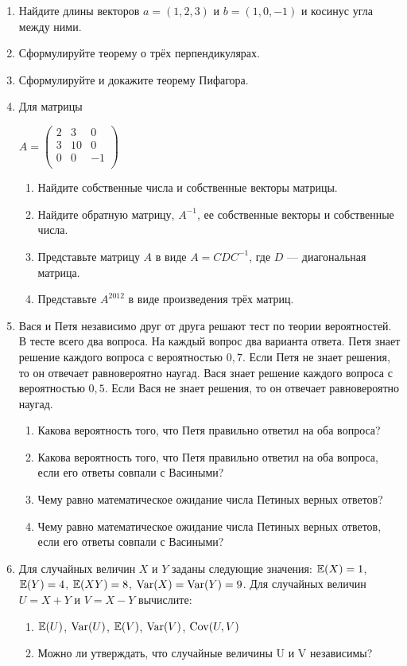 \documentclass[12pt, a4paper]{article}\usepackage[]{graphicx}\usepackage[]{color}
\begin{document}
\begin{enumerate}
\item Найдите длины векторов $a=(1,2,3)$ и $b=(1,0,-1)$ и косинус угла между ними.
\item Сформулируйте теорему о трёх перпендикулярах.
\item Сформулируйте и докажите теорему Пифагора.
\item Для матрицы

$A=\left(%
\begin{array}{ccc}
  2 & 3 & 0 \\
  3 & 10 & 0 \\
  0 & 0 & -1 \\
\end{array}%
\right)$ \\

\begin{enumerate}
\item Найдите собственные числа и собственные векторы матрицы.
\item Найдите обратную матрицу, $A^{-1}$, ее собственные векторы и собственные числа.
\item Представьте матрицу $A$ в виде $A=CDC^{-1}$, где $D$ — диагональная матрица.
\item Представьте $A^{2012}$ в виде произведения трёх матриц.
\end{enumerate}

\item Вася и Петя независимо друг от друга решают тест по теории вероятностей. В тесте всего два вопроса. На каждый вопрос два варианта ответа. Петя знает решение каждого вопроса с вероятностью $0{,}7$. Если Петя не знает решения, то он отвечает равновероятно наугад. Вася знает решение каждого вопроса с вероятностью $0{,}5$. Если Вася не знает решения, то он отвечает равновероятно наугад.
\begin{enumerate}
\item Какова вероятность того, что Петя правильно ответил на оба вопроса?
\item Какова вероятность того, что Петя правильно ответил на оба вопроса, если его ответы совпали с Васиными?
\item Чему равно математическое ожидание числа Петиных верных ответов?
\item Чему равно математическое ожидание числа Петиных верных ответов, если его ответы совпали с Васиными?
\end{enumerate}

\item Для случайных величин $X$ и $Y$ заданы следующие значения: $\mathbb{E}(X)=1$, $\mathbb{E}(Y)=4$, $\mathbb{E}(XY)=8$, $\operatorname{Var}(X)=\operatorname{Var}(Y)=9$. Для случайных величин $U=X+Y$ и $V=X-Y$ вычислите:
\begin{enumerate}
\item $\mathbb{E}(U)$, $\operatorname{Var}(U)$, $\mathbb{E}(V)$, $\operatorname{Var}(V)$, $\operatorname{Cov}(U,V)$
\item Можно ли утверждать, что случайные величины U и V независимы?
\end{enumerate}


\end{enumerate}
\end{document}
